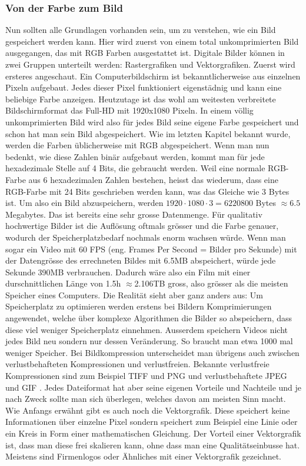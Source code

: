 \subsubsection{Von der Farbe zum Bild}
Nun sollten alle Grundlagen vorhanden sein, um zu verstehen, wie ein Bild gespeichert werden kann. Hier wird zuerst von einem total unkomprimierten Bild ausgegangen, das mit RGB Farben ausgestattet ist. Digitale Bilder können in zwei Gruppen unterteilt werden: Rastergrafiken und Vektorgrafiken. Zuerst wird ersteres angeschaut. Ein Computerbildschirm ist bekanntlicherweise aus einzelnen Pixeln aufgebaut. Jedes dieser Pixel funktioniert eigenstädnig und kann eine beliebige Farbe anzeigen. Heutzutage ist das wohl am weitesten verbreitete Bildschirmformat das Full-HD mit 1920x1080 Pixeln. In einem völlig unkomprimierten Bild wird also für jedes Bild seine eigene Farbe gespeichert und schon hat man sein Bild abgespeichert. Wie im letzten Kapitel bekannt wurde, werden die Farben üblicherweise mit RGB abgespeichert. Wenn man nun bedenkt, wie diese Zahlen binär aufgebaut werden, kommt man für jede hexadezimale Stelle auf 4 Bits, die gebraucht werden. Weil eine normale RGB-Farbe aus 6 hexadezimalen Zahlen bestehen, heisst das wiederum, dass eine RGB-Farbe mit 24 Bits geschrieben werden kann, was das Gleiche wie 3 Bytes ist. Um also ein Bild abzuspeichern, werden $1920 \cdot 1080 \cdot 3=6220800$ Bytes $ \approx  6.5$ Megabytes. Das ist bereits eine sehr grosse Datenmenge. Für qualitativ hochwertige Bilder ist die Auflösung oftmals grösser und die Farbe genauer, wodurch der Speicherplatzbedarf nochmals enorm wachsen würde. Wenn man sogar ein Video mit 60 FPS (eng. Frames Per Second = Bilder pro Sekunde) mit der Datengrösse des errechneten Bildes mit 6.5MB abspeichert, würde jede Sekunde 390MB verbrauchen. Dadurch wäre also ein Film mit einer durschnittlichen Länge von 1.5h $ \approx$2.106TB gross, also grösser als die meisten Speicher eines Computers. Die Realität sieht aber ganz anders aus: Um Speicherplatz zu optimieren werden erstens bei Bildern Komprimierungen angewendet, welche über komplexe Algorithmen die Bilder so abspeichern, dass diese viel weniger Speicherplatz einnehmen. Ausserdem speichern Videos nicht jedes Bild neu sondern nur dessen Veränderung. So braucht man etwa 1000 mal weniger Speicher. Bei Bildkompression unterscheidet man übrigens auch zwischen verlustbehafteten Kompressionen und verlustfreien. Bekannte verlustfreie Kompressionen sind zum Beispiel TIFF und PNG und verlustbehaftete JPEG und GIF \cite{Dateiformate}. Jedes Dateiformat hat aber seine eigenen Vorteile und Nachteile und je nach Zweck sollte man sich überlegen, welches davon am meisten Sinn macht. Wie Anfangs erwähnt gibt es auch noch die Vektorgrafik. Diese speichert keine Informationen über einzelne Pixel sondern speichert zum Beispiel eine Linie oder ein Kreis in Form einer mathematischen Gleichung. Der Vorteil einer Vektorgrafik ist, dass man diese frei skalieren kann, ohne dass man eine Qualitätseinbusse hat. Meistens sind Firmenlogos oder Ähnliches mit einer Vektorgrafik gezeichnet.
